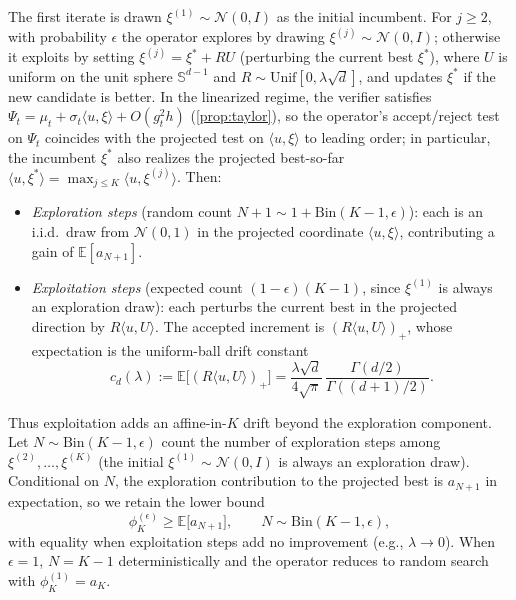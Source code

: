 \begin{example}
\label{ex:eps-greedy}
The first iterate is drawn $\xi^{(1)} \sim \mathcal{N}(0, I)$ as the initial incumbent. For $j \ge 2$, with probability $\epsilon$ the operator explores by drawing $\xi^{(j)} \sim \mathcal{N}(0, I)$; otherwise it exploits by setting $\xi^{(j)} = \xi^* + RU$ (perturbing the current best $\xi^*$), where $U$ is uniform on the unit sphere $\mathbb{S}^{d-1}$ and $R \sim \mathrm{Unif}[0, \lambda\sqrt{d}]$, and updates $\xi^*$ if the new candidate is better. In the linearized regime, the verifier satisfies $\Psi_t = \mu_t + \sigma_t \langle u, \xi\rangle + O(g_t^2 h)$ (\cref{prop:taylor}), so the operator's accept/reject test on $\Psi_t$ coincides with the projected test on $\langle u, \xi\rangle$ to leading order; in particular, the incumbent $\xi^*$ also realizes the projected best-so-far $\langle u, \xi^*\rangle = \max_{j \le K}\langle u, \xi^{(j)}\rangle$. Then:
\begin{itemize}
  \item \emph{Exploration steps} (random count $N+1 \sim 1+\mathrm{Bin}(K-1,\epsilon)$): each is an i.i.d.\ draw from $\mathcal{N}(0, 1)$ in the projected coordinate $\langle u, \xi\rangle$, contributing a gain of $\mathbb{E}[a_{N+1}]$.
  \item \emph{Exploitation steps} (expected count $(1{-}\epsilon)(K{-}1)$, since $\xi^{(1)}$ is always an exploration draw): each perturbs the current best in the projected direction by $R\langle u, U\rangle$. The accepted increment is $(R\langle u, U\rangle)_+$, whose expectation is the uniform-ball drift constant
  \begin{equation}
    c_d(\lambda) := \mathbb{E}\bigl[(R\langle u, U\rangle)_+\bigr] = \frac{\lambda\sqrt{d}}{4\sqrt{\pi}}\,\frac{\Gamma(d/2)}{\Gamma((d+1)/2)}.
    \label{eq:uniform-ball-drift}
  \end{equation}
\end{itemize}
Thus exploitation adds an affine-in-$K$ drift beyond the exploration component. Let $N \sim \mathrm{Bin}(K-1, \epsilon)$ count the number of exploration steps among $\xi^{(2)},\ldots,\xi^{(K)}$ (the initial $\xi^{(1)}\sim\mathcal N(0,I)$ is always an exploration draw). Conditional on $N$, the exploration contribution to the projected best is $a_{N+1}$ in expectation, so we retain the lower bound
\begin{equation}
  \phi_K^{(\epsilon)} \ge \mathbb{E}\bigl[a_{N+1}\bigr], \qquad N \sim \mathrm{Bin}(K-1, \epsilon),
  \label{eq:phi-epsgreedy-lb}
\end{equation}
with equality when exploitation steps add no improvement (e.g., $\lambda \to 0$). When $\epsilon = 1$, $N = K-1$ deterministically and the operator reduces to random search with $\phi_K^{(1)} = a_K$.


\end{example}
